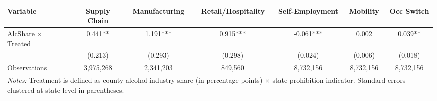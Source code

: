
\begin{tabular}{lcccccc}
\toprule
Variable & Supply Chain & Manufacturing & Retail/Hospitality & Self-Employment & Mobility & Occ Switch\\
\midrule
AlcShare $\times$ Treated & 0.441** & 1.191*** & 0.915*** & -0.061*** & 0.002 & 0.039**\\
 & (0.213) & (0.293) & (0.298) & (0.024) & (0.006) & (0.018)\\
Observations & 3,975,268 & 2,341,203 & 849,560 & 8,732,156 & 8,732,156 & 8,732,156\\
\bottomrule
\multicolumn{7}{p{0.95\textwidth}}{\footnotesize \emph{Notes:} Treatment is defined as county alcohol industry share (in percentage points) $\times$ state prohibition indicator. Standard errors clustered at state level in parentheses.}\\
\end{tabular}
